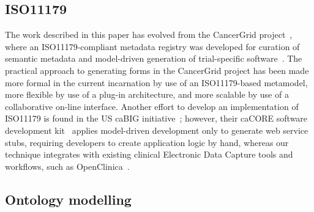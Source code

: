 \subsection{ISO11179}

The work described in this paper has evolved from the CancerGrid
project~\cite{davi14}, where an ISO11179-compliant metadata registry
was developed for curation of semantic metadata and model-driven
generation of trial-specific software~\cite{davi12, Abler2011}. The
practical approach to generating forms in the CancerGrid project has
been made more formal in the current incarnation 
by use of an ISO11179-based metamodel, more
flexible by use of a plug-in architecture, and more scalable by use of a
collaborative on-line interface. 
Another effort to develop an
implementation of ISO11179 is found in the US caBIG
initiative~\cite{kunz09}; however, their 
caCORE software development kit~\cite{koma08}
applies model-driven development only to generate web service stubs,
requiring developers to create application logic by hand, whereas our
technique integrates with existing clinical Electronic Data Capture
tools and workflows, such as OpenClinica~\cite{oc}.

\subsection{Ontology modelling}


